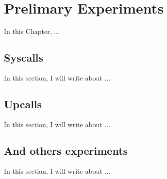 \chapter{Prelimary Experiments}
\label{ch.experiments}

In this Chapter, ...

\section{Syscalls}
    In this section, I will write about ...

\section{Upcalls}
    In this section, I will write about ...
    
\section{And others experiments}
    In this section, I will write about ...
